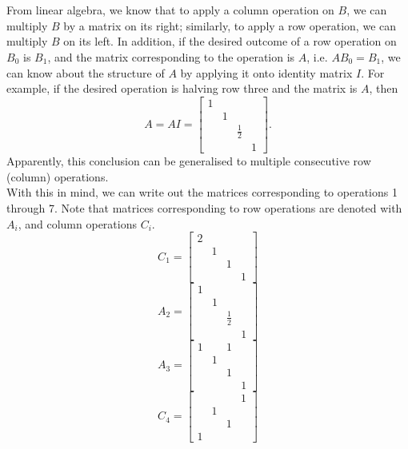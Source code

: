 \documentclass[11pt]{article}
\begin{document}
\maketitle
\section{}
\subsection{}
\subsubsection{}
From linear algebra, we know that to apply a column operation on $B$, we can multiply $B$ by a matrix on its right; similarly, to apply a row operation, we can multiply $B$ on its left. In addition, if the desired outcome of a row operation on $B_0$ is $B_1$, and the matrix corresponding to the operation is $A$, i.e. $AB_0=B_1$, we can know about the structure of $A$ by applying it onto identity matrix $I$. For example, if the desired operation is halving row three and the matrix is $A$, then $$A=AI=\begin{bmatrix} 1\\&1\\& &\frac12\\&&&1\end{bmatrix}.$$Apparently, this conclusion can be generalised to multiple consecutive row (column) operations.\\[0.5cm]
With this in mind, we can write out the matrices corresponding to operations 1 through 7. Note that matrices corresponding to row operations are denoted with $A_i$, and column operations $C_i$.
$$C_1=\begin{bmatrix} 2\\&1\\&&1\\&&&1\end{bmatrix} $$
$$A_2=\begin{bmatrix} 1\\&1\\& &\frac12\\&&&1\end{bmatrix}$$
$$A_3=\begin{bmatrix} 1&&1&\\&1\\&&1\\&&&1\end{bmatrix} $$
$$C_4=\begin{bmatrix} &&&1\\&1\\&&1\\1\end{bmatrix} $$
\end{document}
